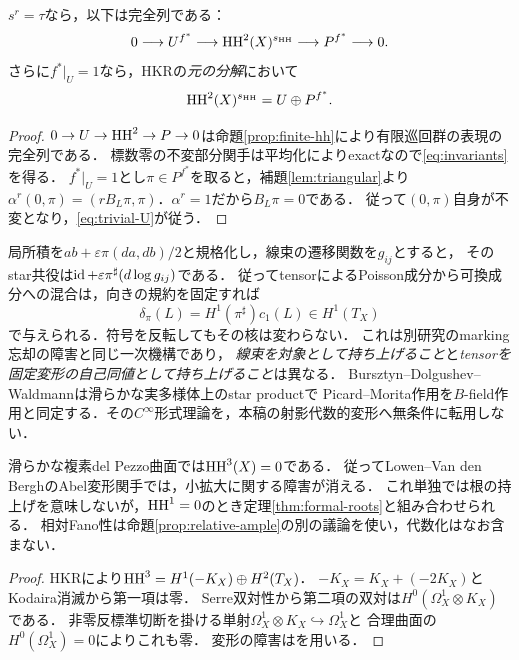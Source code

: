 \begin{proposition}[不変Poisson方向の補償]\label{prop:invariant-poisson}
$s^r=\tau$なら，以下は完全列である：
\begin{equation}\label{eq:invariants}
 0\longrightarrow U^{f^*}\longrightarrow\operatorname{HH}^2(X)^{s_{\operatorname{HH}}}
 \longrightarrow P^{f^*}\longrightarrow0.
\end{equation}
さらに$f^*|_U=1$なら，HKRの\emph{元の分解}において
\begin{equation}\label{eq:trivial-U}
 \operatorname{HH}^2(X)^{s_{\operatorname{HH}}}=U\oplus P^{f^*}.
\end{equation}
\end{proposition}
\begin{proof}
$0\to U\to\operatorname{HH}^2\to P\to0$は命題\ref{prop:finite-hh}により有限巡回群の表現の完全列である．
標数零の不変部分関手は平均化によりexactなので\eqref{eq:invariants}を得る．
$f^*|_U=1$とし$\pi\in P^{f^*}$を取ると，補題\ref{lem:triangular}より
$\alpha^r(0,\pi)=(rB_L\pi,\pi)$．$\alpha^r=1$だから$B_L\pi=0$である．
従って$(0,\pi)$自身が不変となり，\eqref{eq:trivial-U}が従う．
\end{proof}

\begin{remark}\label{rem:picard}
局所積を$ab+\varepsilon\pi(da,db)/2$と規格化し，線束の遷移関数を$g_{ij}$とすると，
そのstar共役は$\operatorname{id}+\varepsilon\pi^\sharp(d\log g_{ij})$である．
従ってtensorによるPoisson成分から可換成分への混合は，向きの規約を固定すれば
\[
 \delta_\pi(L)=H^1(\pi^\sharp)c_1(L)\in H^1(T_X)
\]
で与えられる．符号を反転してもその核は変わらない．
これは別研究\cite{Marking}のmarking忘却の障害と同じ一次機構であり，
\emph{線束を対象として持ち上げること}と\emph{tensorを固定変形の自己同値として持ち上げること}は異なる．
Bursztyn--Dolgushev--Waldmann\cite[Theorem 3.11]{BDW}は滑らかな実多様体上のstar productで
Picard--Morita作用を$B$-field作用と同定する．その$C^\infty$形式理論を，本稿の射影代数的変形へ無条件に転用しない．
\end{remark}

\begin{proposition}[圏自身の形式的非障害性]\label{prop:hh3}
滑らかな複素del Pezzo曲面では$\operatorname{HH}^3(X)=0$である．
従ってLowen--Van den BerghのAbel変形関手では，小拡大に関する障害が消える．
これ単独では根の持上げを意味しないが，$\operatorname{HH}^1=0$のとき定理\ref{thm:formal-roots}と組み合わせられる．
相対Fano性は命題\ref{prop:relative-ample}の別の議論を使い，代数化はなお含まない．
\end{proposition}
\begin{proof}
HKRにより$\operatorname{HH}^3=H^1(-K_X)\oplus H^2(T_X)$．
$-K_X=K_X+(-2K_X)$とKodaira消滅から第一項は零．
Serre双対性から第二項の双対は$H^0(\Omega_X^1\otimes K_X)$である．
非零反標準切断を掛ける単射$\Omega_X^1\otimes K_X\hookrightarrow\Omega_X^1$と
合理曲面の$H^0(\Omega_X^1)=0$によりこれも零．
変形の障害は\cite[Theorem 3.1]{LVdB}を用いる．
\end{proof}

